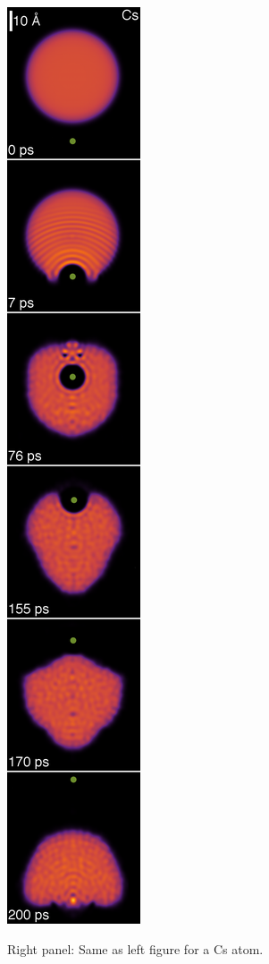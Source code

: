 \documentclass[portrait,a0paper,fontscale=0.277]{baposter}
\begin{document}
\begin{poster}
{{\begin{center}
\hspace{5px}
\includegraphics[width=0.410\linewidth]{Cs-vertical}
\end{center}
\vspace{-10px}
\noindent Right panel: Same as left figure for a Cs atom.
}
}
 

\end{poster}
\end{document}

